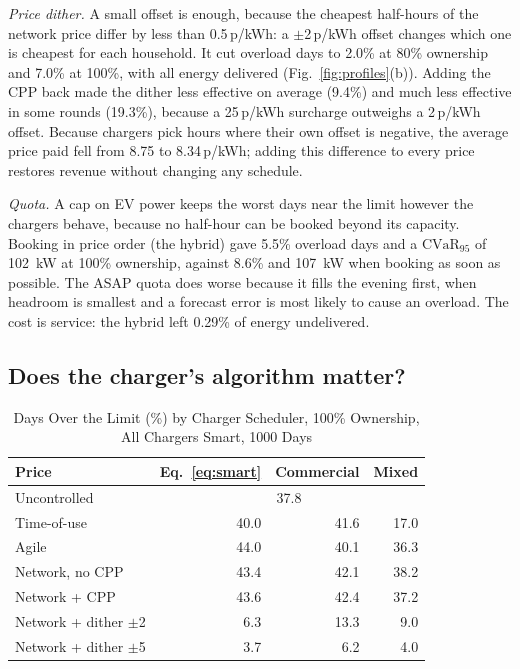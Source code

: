 \documentclass[conference]{IEEEtran}
\newcommand{\pkwh}{\,p/kWh}
\newcommand{\CVaR}{\mathrm{CVaR}}
\begin{document}
\emph{Price dither.} A small offset is enough, because the cheapest half-hours
of the network price differ by less than 0.5\pkwh: a $\pm$2\pkwh{} offset
changes which one is cheapest for each household. It cut overload days to
2.0\% at 80\% ownership and 7.0\% at 100\%, with all energy delivered
(Fig.~\ref{fig:profiles}(b)). Adding the CPP back made the dither less
effective on average (9.4\%) and much less effective in some rounds
(19.3\%), because a 25\pkwh{} surcharge outweighs a 2\pkwh{} offset. Because
chargers pick hours where their own offset is negative, the average price
paid fell from 8.75 to 8.34\pkwh; adding this difference to every price
restores revenue without changing any schedule.

\emph{Quota.} A cap on EV power keeps the worst days near the limit however
the chargers behave, because no half-hour can be booked beyond its capacity.
Booking in price order (the hybrid) gave 5.5\% overload days and a
$\CVaR_{95}$ of 102~kW at 100\% ownership, against 8.6\% and 107~kW when
booking as soon as possible. The ASAP quota does worse because it fills the
evening first, when headroom is smallest and a forecast error is most likely
to cause an overload. The cost is service: the hybrid left 0.29\% of energy
undelivered.

\subsection{Does the charger's algorithm matter?}

\begin{table}[t]
\caption{Days Over the Limit (\%) by Charger Scheduler, 100\% Ownership,
All Chargers Smart, 1000 Days}
\label{tab:sched}
\centering
\footnotesize
\setlength{\tabcolsep}{5pt}
\begin{tabular}{@{}lrrr@{}}
\toprule
Price & Eq.~\eqref{eq:smart} & Commercial & Mixed\\
\midrule
Uncontrolled & \multicolumn{3}{c}{37.8}\\
Time-of-use & 40.0 & 41.6 & 17.0\\
Agile & 44.0 & 40.1 & 36.3\\
Network, no CPP & 43.4 & 42.1 & 38.2\\
Network + CPP & 43.6 & 42.4 & 37.2\\
Network + dither $\pm$2 & 6.3 & 13.3 & 9.0\\
Network + dither $\pm$5 & 3.7 & 6.2 & 4.0\\
\bottomrule
\end{tabular}
\end{table}
\end{document}
